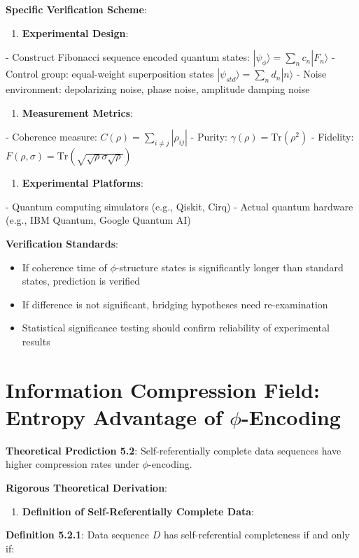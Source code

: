 \textbf{Specific Verification Scheme}:
\begin{enumerate}
\item \textbf{Experimental Design}:
\end{enumerate}
   - Construct Fibonacci sequence encoded quantum states: $|\psi_\phi\rangle = \sum_{n} c_n |F_n\rangle$
   - Control group: equal-weight superposition states $|\psi_{std}\rangle = \sum_{n} d_n |n\rangle$
   - Noise environment: depolarizing noise, phase noise, amplitude damping noise

\begin{enumerate}
\item \textbf{Measurement Metrics}:
\end{enumerate}
   - Coherence measure: $C(\rho) = \sum_{i \neq j} |\rho_{ij}|$
   - Purity: $\gamma(\rho) = \text{Tr}(\rho^2)$
   - Fidelity: $F(\rho, \sigma) = \text{Tr}(\sqrt{\sqrt{\rho}\sigma\sqrt{\rho}})$

\begin{enumerate}
\item \textbf{Experimental Platforms}:
\end{enumerate}
   - Quantum computing simulators (e.g., Qiskit, Cirq)
   - Actual quantum hardware (e.g., IBM Quantum, Google Quantum AI)

\textbf{Verification Standards}:
\begin{itemize}
\item If coherence time of $\phi$-structure states is significantly longer than standard states, prediction is verified
\item If difference is not significant, bridging hypotheses need re-examination
\item Statistical significance testing should confirm reliability of experimental results
\end{itemize}

\section{Information Compression Field: Entropy Advantage of $\phi$-Encoding}
\label{sec:ch05_applications:information-compression-field-entropy-advantage-of-phi-encoding}

\textbf{Theoretical Prediction 5.2}: Self-referentially complete data sequences have higher compression rates under $\phi$-encoding.

\textbf{Rigorous Theoretical Derivation}:

\begin{enumerate}
\item \textbf{Definition of Self-Referentially Complete Data}:
\end{enumerate}
   \textbf{Definition 5.2.1}: Data sequence $D$ has self-referential completeness if and only if:
\label{def:5.2.1}
   
